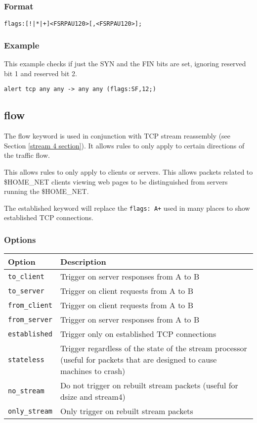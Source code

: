 \documentclass[english]{report}
\begin{document}
\subsubsection{Format}

\begin{verbatim}
flags:[!|*|+]<FSRPAU120>[,<FSRPAU120>];
\end{verbatim}

\subsubsection{Example}

This example checks if just the SYN and the FIN bits are set, ignoring reserved
bit 1 and reserved bit 2.
\begin{verbatim}
alert tcp any any -> any any (flags:SF,12;)
\end{verbatim}

\subsection{flow\label{flow section}}

The flow keyword is used in conjunction with TCP stream reassembly
(see Section \ref{stream 4 section}). It allows rules to only apply
to certain directions of the traffic flow. 

This allows rules to only apply to clients or servers. This allows
packets related to \$HOME\_NET clients viewing web pages to be distinguished
from servers running the \$HOME\_NET.

The established keyword will replace the \texttt{flags: A+} used in
many places to show established TCP connections.

\subsubsection*{Options}

\begin{tabular}{| l | p{5in} |}
\hline
{\bf Option} & {\bf Description}\\
\hline
\hline
\texttt{to\_client} & Trigger on server responses from A to B\\
\hline
\texttt{to\_server} & Trigger on client requests from A to B\\
\hline
\texttt{from\_client} & Trigger on client requests from A to B\\
\hline
\texttt{from\_server} & Trigger on server responses from A to B\\
\hline
\texttt{established} & Trigger only on established TCP connections\\
\hline
\texttt{stateless} & Trigger regardless of the state of the stream processor
(useful for packets that are designed to cause machines to crash)\\
\hline
\texttt{no\_stream} & Do not trigger on rebuilt stream packets (useful 
for dsize and stream4)\\
\hline
\texttt{only\_stream} & Only trigger on rebuilt stream
packets\\
\hline
\end{tabular}
\end{document}
